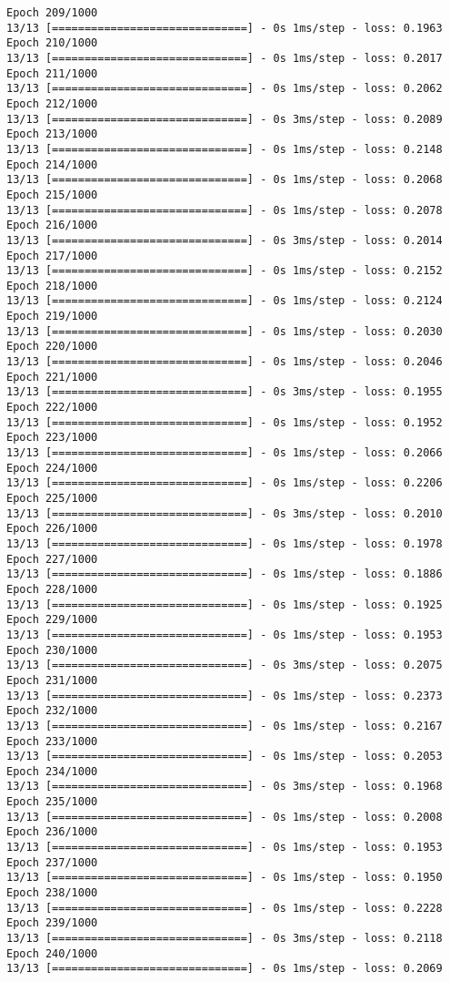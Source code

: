 \documentclass[11pt]{article}
\begin{document}
\begin{Verbatim}[commandchars=\\\{\}]
Epoch 209/1000
13/13 [==============================] - 0s 1ms/step - loss: 0.1963
Epoch 210/1000
13/13 [==============================] - 0s 1ms/step - loss: 0.2017
Epoch 211/1000
13/13 [==============================] - 0s 1ms/step - loss: 0.2062
Epoch 212/1000
13/13 [==============================] - 0s 3ms/step - loss: 0.2089
Epoch 213/1000
13/13 [==============================] - 0s 1ms/step - loss: 0.2148
Epoch 214/1000
13/13 [==============================] - 0s 1ms/step - loss: 0.2068
Epoch 215/1000
13/13 [==============================] - 0s 1ms/step - loss: 0.2078
Epoch 216/1000
13/13 [==============================] - 0s 3ms/step - loss: 0.2014
Epoch 217/1000
13/13 [==============================] - 0s 1ms/step - loss: 0.2152
Epoch 218/1000
13/13 [==============================] - 0s 1ms/step - loss: 0.2124
Epoch 219/1000
13/13 [==============================] - 0s 1ms/step - loss: 0.2030
Epoch 220/1000
13/13 [==============================] - 0s 1ms/step - loss: 0.2046
Epoch 221/1000
13/13 [==============================] - 0s 3ms/step - loss: 0.1955
Epoch 222/1000
13/13 [==============================] - 0s 1ms/step - loss: 0.1952
Epoch 223/1000
13/13 [==============================] - 0s 1ms/step - loss: 0.2066
Epoch 224/1000
13/13 [==============================] - 0s 1ms/step - loss: 0.2206
Epoch 225/1000
13/13 [==============================] - 0s 3ms/step - loss: 0.2010
Epoch 226/1000
13/13 [==============================] - 0s 1ms/step - loss: 0.1978
Epoch 227/1000
13/13 [==============================] - 0s 1ms/step - loss: 0.1886
Epoch 228/1000
13/13 [==============================] - 0s 1ms/step - loss: 0.1925
Epoch 229/1000
13/13 [==============================] - 0s 1ms/step - loss: 0.1953
Epoch 230/1000
13/13 [==============================] - 0s 3ms/step - loss: 0.2075
Epoch 231/1000
13/13 [==============================] - 0s 1ms/step - loss: 0.2373
Epoch 232/1000
13/13 [==============================] - 0s 1ms/step - loss: 0.2167
Epoch 233/1000
13/13 [==============================] - 0s 1ms/step - loss: 0.2053
Epoch 234/1000
13/13 [==============================] - 0s 3ms/step - loss: 0.1968
Epoch 235/1000
13/13 [==============================] - 0s 1ms/step - loss: 0.2008
Epoch 236/1000
13/13 [==============================] - 0s 1ms/step - loss: 0.1953
Epoch 237/1000
13/13 [==============================] - 0s 1ms/step - loss: 0.1950
Epoch 238/1000
13/13 [==============================] - 0s 1ms/step - loss: 0.2228
Epoch 239/1000
13/13 [==============================] - 0s 3ms/step - loss: 0.2118
Epoch 240/1000
13/13 [==============================] - 0s 1ms/step - loss: 0.2069

\end{Verbatim}
\end{document}
